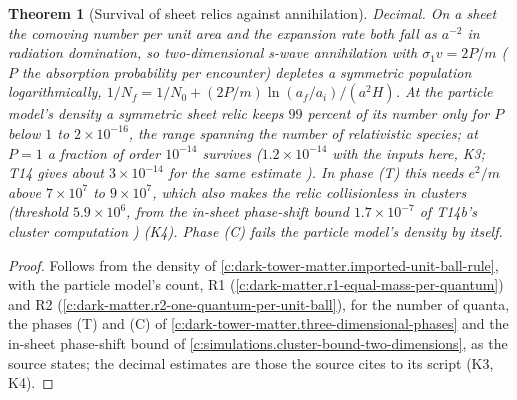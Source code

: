 \documentclass[11pt]{article}
\newtheorem{theorem}{Theorem}[section]
\theoremstyle{definition}
\theoremstyle{plain}
\newcommand{\changedmark}[2]{\marginpar{\raggedright\scriptsize\color{#1}#2}}
\begin{document}
\begin{theorem}[Survival of sheet relics against annihilation]\label{c:dark-tower-matter.survival-sheets}
\changedmark{BurntOrange}{changed since the deposit}
Decimal. On a sheet the comoving number per unit area and the expansion rate both fall as $a^{-2}$ in radiation domination, so two-dimensional s-wave annihilation with $\sigma_{1}v = 2P/m$ ($P$ the absorption probability per encounter) depletes a symmetric population logarithmically, $1/N_{f} = 1/N_{0} + (2P/m)\ln(a_{f}/a_{i})/(a^{2}H)$. At the particle model's density a symmetric sheet relic keeps $99$ percent of its number only for $P$ below $1$ to $2 \times 10^{-16}$, the range spanning the number of relativistic species; at $P = 1$ a fraction of order $10^{-14}$ survives ($1.2 \times 10^{-14}$ with the inputs here, K3; T14 gives about $3 \times 10^{-14}$ for the same estimate \cite[Sec.~7.7]{ButlerT14}). In phase (T) this needs $e^{2}/m$ above $7 \times 10^{7}$ to $9 \times 10^{7}$, which also makes the relic collisionless in clusters (threshold $5.9 \times 10^{6}$, from the in-sheet phase-shift bound $1.7 \times 10^{-7}$ of T14b's cluster computation \cite[Comp.~3.3, Prem.~2.12]{ButlerT14b}) (K4). Phase (C) fails the particle model's density by itself.
\end{theorem}
\begin{proof}
Follows from the density of \ref{c:dark-tower-matter.imported-unit-ball-rule}, with the particle model's count, R1 (\ref{c:dark-matter.r1-equal-mass-per-quantum}) and R2 (\ref{c:dark-matter.r2-one-quantum-per-unit-ball}), for the number of quanta, the phases (T) and (C) of \ref{c:dark-tower-matter.three-dimensional-phases} and the in-sheet phase-shift bound of \ref{c:simulations.cluster-bound-two-dimensions}, as the source states; the decimal estimates are those the source cites to its script (K3, K4).

\end{proof}
\end{document}
